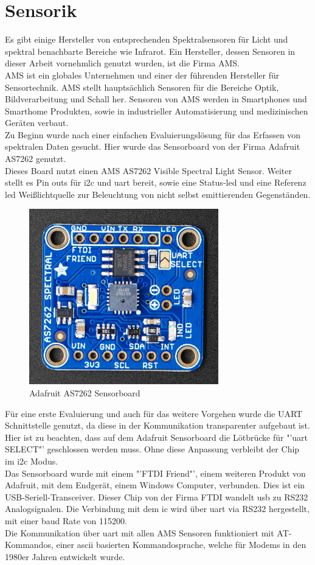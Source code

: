 \documentclass[11pt]{scrartcl}
\begin{document}
\section{Sensorik}
Es gibt einige Hersteller von entsprechenden Spektralsensoren für Licht und spektral benachbarte Bereiche wie Infrarot.
Ein Hersteller, dessen Sensoren in dieser Arbeit vornehmlich genutzt wurden, ist die Firma AMS.\\
AMS ist ein globales Unternehmen und einer der führenden Hersteller für Sensortechnik. AMS stellt hauptsächlich Sensoren für die Bereiche
Optik, Bildverarbeitung und Schall her. Sensoren von AMS werden in Smartphones und Smarthome Produkten, sowie in industrieller Automatisierung
und medizinischen Geräten verbaut. \cite{ams}\\
Zu Beginn wurde nach einer einfachen Evaluierungslösung für das Erfassen von spektralen Daten gesucht. Hier wurde das
Sensorboard von der Firma Adafruit AS7262 genutzt. \cite{adafruit}\\
Dieses Board nutzt einen AMS AS7262 Visible Spectral Light Sensor. Weiter stellt es Pin outs für \ac{i2c} und \ac{uart} bereit,
sowie eine Status-\ac{led} und eine Referenz \ac{led} Weißlichtquelle zur Beleuchtung von nicht selbst emittierenden Gegenständen.
\begin{figure}[H]
    \begin{center}
        \includegraphics[width=.48\textwidth]{images/AS7262_front.png}
    \end{center}
    \caption{Adafruit AS7262 Sensorboard \cite{adafruit}}
\end{figure}
\noindent
Für eine erste Evaluierung und auch für das weitere Vorgehen wurde die UART Schnittstelle genutzt, da diese in der Kommunikation
transparenter aufgebaut ist.\\
Hier ist zu beachten, dass auf dem Adafruit Sensorboard die Lötbrücke für "'\ac{uart} SELECT"' geschlossen werden muss. Ohne diese
Anpassung verbleibt der Chip im \ac{i2c} Modus.\\
Das Sensorboard wurde mit einem "'FTDI Friend"', einem weiteren Produkt von Adafruit, mit dem Endgerät, einem Windows Computer, verbunden.
Dies ist ein USB-Seriell-Transceiver. Dieser Chip von der Firma FTDI wandelt \ac{usb} zu RS232 Analogsignalen. Die Verbindung mit dem \ac{ic}
wird über \ac{uart} via RS232 hergestellt, mit einer \ac{baud} Rate von 115200.\\
Die Kommunikation über \ac{uart} mit allen AMS Sensoren funktioniert mit AT-Kommandos, einer \ac{ascii} basierten Kommandosprache,
welche für Modems in den 1980er Jahren entwickelt wurde.
\end{document}
